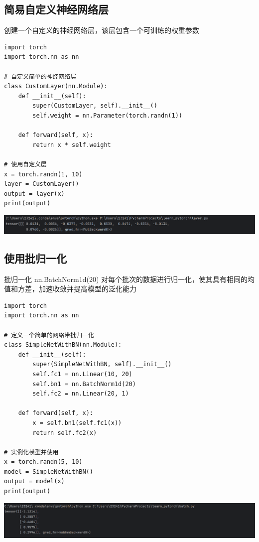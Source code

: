 \documentclass[UTF8,a4paper]{ctexart}
\begin{document}
\begin{sloppypar}
	\subsection{简易自定义神经网络层}
	创建一个自定义的神经网络层，该层包含一个可训练的权重参数
	\begin{lstlisting}
import torch
import torch.nn as nn

# 自定义简单的神经网络层
class CustomLayer(nn.Module):
    def __init__(self):
        super(CustomLayer, self).__init__()
        self.weight = nn.Parameter(torch.randn(1))

    def forward(self, x):
        return x * self.weight

# 使用自定义层
x = torch.randn(1, 10)
layer = CustomLayer()
output = layer(x)
print(output)
    \end{lstlisting}
	
	\includegraphics[width = 16cm]{19}
	
	\subsection{使用批归一化}
	批归一化 nn.BatchNorm1d(20) 对每个批次的数据进行归一化，使其具有相同的均值和方差，加速收敛并提高模型的泛化能力
	
	\begin{lstlisting}
import torch
import torch.nn as nn

# 定义一个简单的网络带批归一化
class SimpleNetWithBN(nn.Module):
    def __init__(self):
        super(SimpleNetWithBN, self).__init__()
        self.fc1 = nn.Linear(10, 20)
        self.bn1 = nn.BatchNorm1d(20)
        self.fc2 = nn.Linear(20, 1)

    def forward(self, x):
        x = self.bn1(self.fc1(x))
        return self.fc2(x)

# 实例化模型并使用
x = torch.randn(5, 10)
model = SimpleNetWithBN()
output = model(x)
print(output)
    \end{lstlisting}
	
	\includegraphics[width = 16cm]{20}


\end{sloppypar}
\end{document}
